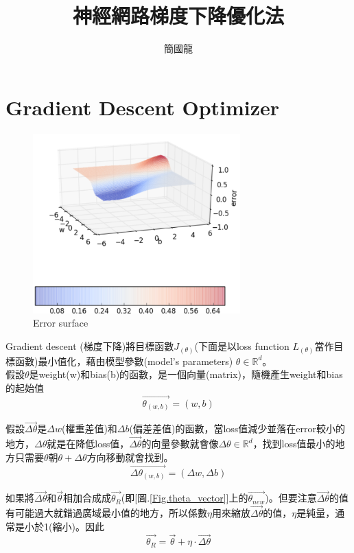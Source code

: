 \documentclass[13pt, a4paper]{report}
\title{神經網路梯度下降優化法}
\author{簡國龍}
\begin{document}
\maketitle
\tableofcontents

\chapter{Gradient Descent Optimizer}
\begin{figure}[hbt!]
\center
\includegraphics[width=8cm]{Error_surface}
\caption{Error surface \href{https://hackernoon.com/the-reason-behind-moving-in-the-direction-opposite-to-the-gradient-f9566b95370b}{\faLink}}\label{Fig.Error_surface} 
\end{figure}
Gradient descent (梯度下降)將目標函數$J_{(\theta)}$(下面是以loss function $L_{(\theta)}$當作目標函數)最小值化，藉由模型參數(model's parameters) $\theta \in \mathbb{R}^d$。\\
假設$\theta$是weight(w)和bias(b)的函數，是一個向量(matrix)，隨機產生weight和bias的起始值
$$\overrightarrow{\theta_{(w, b)}}=(w, b)$$

假設$\overrightarrow{\Delta\theta}$是$\Delta w$(權重差值)和$\Delta b$(偏差差值)的函數，當loss值減少並落在error較小的地方，$\Delta\theta$就是在降低loss值，$\overrightarrow{\Delta\theta}$的向量參數就會像$\Delta\theta \in \mathbb{R}^d$，找到loss值最小的地方只需要$\theta$朝$\theta+\Delta\theta$方向移動就會找到。
$$\overrightarrow{\Delta\theta_{(w, b)}}=(\Delta w, \Delta b)$$

如果將$\overrightarrow{\Delta\theta}$和$\overrightarrow{\theta}$相加合成成$\overrightarrow{\theta_{R}}$(即[圖.\ref{Fig.theta_vector}]上的$\overrightarrow{\theta_{new}}$)。但要注意$\overrightarrow{\Delta\theta}$的值有可能過大就錯過廣域最小值的地方，所以係數$\eta$用來縮放$\overrightarrow{\Delta\theta}$的值，$\eta$是純量，通常是小於1(縮小)。因此
$$\overrightarrow{\theta_{R}}=\overrightarrow{\theta}+\eta\cdot\overrightarrow{\Delta\theta}$$
\end{document}
